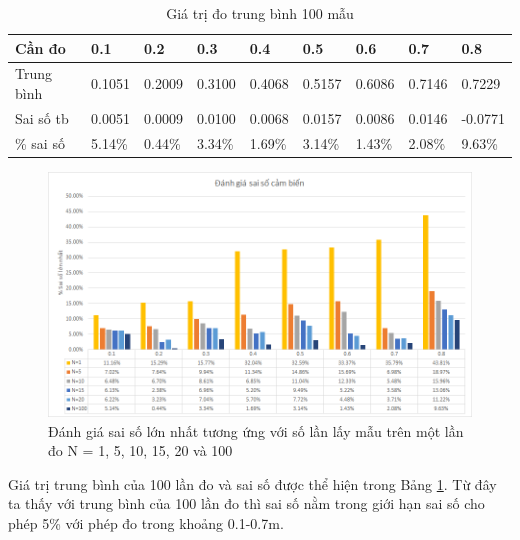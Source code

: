 \begin{table}[htbp]
    \begin{tabular}{|m{1.5cm}|m{1.2cm}|m{1.2cm}|m{1.2cm}|m{1.2cm}|m{1.2cm}|m{1.2cm}|m{1.2cm}|m{1.4cm}|}
        \hline
        Cần đo     & 0.1      & 0.2      & 0.3      & 0.4      & 0.5      & 0.6      & 0.7      & 0.8      \\ \hline
        Trung bình & 0.1051   & 0.2009   & 0.3100   & 0.4068   & 0.5157   & 0.6086   & 0.7146       & 0.7229 \\ \hline
        Sai số tb & 0.0051 & 0.0009 &   0.0100 & 0.0068 &   0.0157 & 0.0086 &   0.0146 & -0.0771 \\ \hline
        \% sai số  & 5.14\% & 	0.44\% &	3.34\% &	1.69\% &	3.14\% &	1.43\% &	2.08\% &	9.63\% \\
        \hline
    \end{tabular}
    \caption{Giá trị đo trung bình 100 mẫu}
    \label{table:ir-evarage}
\end{table}


\begin{figure}[htbp]
    \centering
    \includegraphics[width=\textwidth]{figures/chart_IReval_MaxPercent.png}
    \caption[Đánh giá sai số lớn nhất tương ứng với số lần lấy mẫu]{Đánh giá sai số lớn nhất tương ứng với số lần lấy mẫu trên một lần đo N = 1, 5, 10, 15, 20 và 100}
    \label{chart:IR-eval-NumSample}
\end{figure}

 Giá trị trung bình của 100 lần đo và sai số được thể hiện trong Bảng \ref{table:ir-evarage}. Từ đây ta thấy với trung bình của 100 lần đo thì sai số nằm trong giới hạn sai số cho phép 5\% với phép đo trong khoảng 0.1-0.7m.

